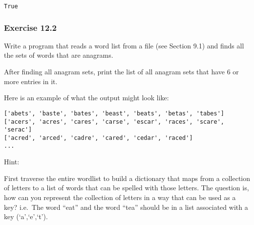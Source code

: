 \documentclass[11pt]{article}
\makeatletter
\newcommand{\boxspacing}{\kern\kvtcb@left@rule\kern\kvtcb@boxsep}
\newcommand{\prompt}[4]{
        {\ttfamily\llap{{\color{#2}[#3]:\hspace{3pt}#4}}\vspace{-\baselineskip}}
    }
\makeatother
\begin{document}
            \begin{tcolorbox}[breakable, size=fbox, boxrule=.5pt, pad at break*=1mm, opacityfill=0]
\prompt{Out}{outcolor}{10}{\boxspacing}
\begin{Verbatim}[commandchars=\\\{\}]
True
\end{Verbatim}
\end{tcolorbox}
        
    \hypertarget{exercise-12.2}{%
\subsubsection{Exercise 12.2}\label{exercise-12.2}}

Write a program that reads a word list from a file (see Section 9.1) and
finds all the sets of words that are anagrams.

After finding all anagram sets, print the list of all anagram sets that
have 6 or more entries in it.

Here is an example of what the output might look like:

\begin{verbatim}
['abets', 'baste', 'bates', 'beast', 'beats', 'betas', 'tabes']
['acers', 'acres', 'cares', 'carse', 'escar', 'races', 'scare', 'serac']
['acred', 'arced', 'cadre', 'cared', 'cedar', 'raced']
...
\end{verbatim}

Hint:

First traverse the entire wordlist to build a dictionary that maps from
a collection of letters to a list of words that can be spelled with
those letters. The question is, how can you represent the collection of
letters in a way that can be used as a key? i.e.~The word ``eat'' and
the word ``tea'' should be in a list associated with a key
(`a',`e',`t').
\end{document}
